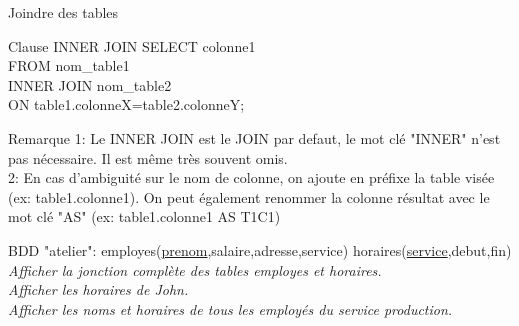 \documentclass[xetex,dvipsnames]{beamer}
\begin{document}
\begin{frame}[t]{Joindre des tables}

	\begin{alertblock}{Clause INNER JOIN}
		SELECT colonne1 \\FROM nom\_table1 \\INNER JOIN nom\_table2 \\ON table1.colonneX=table2.colonneY;
	\end{alertblock}
\begin{footnotesize}
	\begin{block}{Remarque}
	 1: Le INNER JOIN est le JOIN par defaut, le mot clé "INNER" n'est pas nécessaire. Il est même très souvent omis.
	\\2: En cas d'ambiguité sur le nom de colonne, on ajoute en préfixe la table visée (ex: table1.colonne1). On peut également renommer la colonne résultat avec le mot clé "AS" (ex: table1.colonne1 AS T1C1)
	\end{block}
\end{footnotesize}
		
\begin{scriptsize}
		\vspace{1em}
		BDD "atelier": employes(\underline{prenom},salaire,adresse,service) horaires(\underline{service},debut,fin)\\
		\vspace{0.5em}
		\textit{Afficher la jonction complète des tables employes et horaires.}\\
		\textit{Afficher les horaires de John.}\\
		\textit{Afficher les noms et horaires de tous les employés du service production.}\\
\end{scriptsize}
\end{frame}
\end{document}
